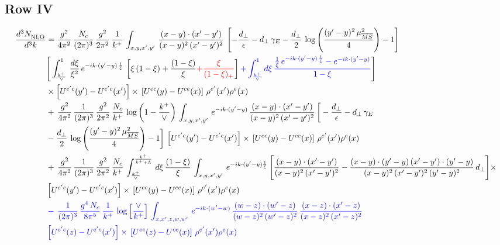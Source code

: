 \documentclass[9pt]{article}
\newcommand{\new}[1]{{\color{blue}#1}}
\newcommand{\nc}{\color{blue}}
\numberwithin{equation}{section}
\begin{document}
\subsection{Row IV}
\begin{align}
    \frac{d^{3}N_{\rm NLO}^{\rm}}{d^{3}k}  & = \frac{g^{2}}{4\pi^{2}}\, \frac{N_{c}}{(2\pi)^{3}}\,\frac{g^{2}}{2\pi^{2}}\, \frac{1}{k^{+}}\,\int_{x,y,x',y'}\,\frac{(x-y)\cdot (x'-y')}{(x-y)^{2}\,(x'-y')^{2}}\,\left[-\frac{d_{\perp}}{\epsilon}-d_{\perp}\,\gamma_{E}-\frac{d_{\perp}}{2}\,\log{\left(\frac{(y'-y)^{2}\,\mu^{2}_{\overline{MS}}}{4}\right)}-1\right]\,\notag \\ & \Bigg[\int_{\frac{k^{+}}{\vee}}^{1}\,\frac{d\xi}{\xi^{2}}\,e^{-ik\cdot (y'-y)\,\frac{1}{\xi}}\,\left[\xi\,(1-\xi)+\frac{(1-\xi)}{\xi}{\color{red}+\frac{\xi}{(1-\xi)_{+}}}\right]\new{+\int_{\frac{k^{+}}{\vee}}^{1}d\xi\,\frac{\frac{1}{\xi}\,e^{-ik\cdot (y'-y)\,\frac{1}{\xi}}-e^{-ik\cdot (y'-y)}}{1-\xi}}\Bigg]\notag \\ & \times \left[U^{e'c}(y') - U^{e'c}(x')\right] \times\, \left[U^{ec}(y) - U^{ce}(x)\right]\, \rho^{e'}(x') \rho^{e}(x)\notag \\ &  +\, \frac{g^{2}}{4\pi^{2}}\, \frac{1}{(2\pi)^{3}}\,\frac{g^{2}}{2\pi^{2}}\, \frac{N_{c}}{k^{+}}\, \log{\left(1-\frac{k^{+}}{\vee}\right)}\,\int_{x,y,x',y'}\,e^{-ik\cdot (y'-y)}\,\frac{(x-y)\cdot (x'-y')}{(x-y)^{2}\,(x'-y')^{2}}\,\bigg[-\frac{d_{\perp}}{\epsilon}-d_{\perp}\,\gamma_{E}\notag \\ & -\frac{d_{\perp}}{2}\,\log{\left(\frac{(y'-y)^{2}\,\mu^{2}_{\overline{MS}}}{4}\right)}-1\bigg]\,\left[U^{e'c}(y') - U^{e'c}(x')\right] \times\, \left[U^{ec}(y) - U^{ce}(x)\right]\, \rho^{e'}(x') \rho^{e}(x)\notag \\ & +\,\frac{g^{2}}{4\pi^{2}}\, \frac{1}{(2\pi)^{3}}\,\frac{g^{2}}{2\pi^{2}}\, \frac{N_{c}}{k^{+}}\,\int_{\frac{k^{+}}{\vee}}^{\frac{k^{+}}{k^{+}+\Lambda}}\,d\xi\, \frac{(1-\xi)}{\xi}\, \int_{x,y,x',y'}\,e^{-ik\cdot (y'-y)\frac{1}{\xi}}\,\Bigg[\frac{(x-y)\cdot (x'-y')}{(x-y)^{2}\, (x'-y')^{2}} -\frac{(x-y)\cdot (y'-y)\, (x'-y')\cdot (y'-y)}{(x-y)^{2}\,(x'-y')^{2}\,(y'-y)^{2}}\,d_{\perp}\Bigg]\times\notag \\ &  \left[U^{e'c}(y') - U^{e'c}(x')\right] \times\, \left[U^{ec}(y) - U^{ce}(x)\right]\, \rho^{e'}(x') \rho^{e}(x)
\notag \\ & \nc -\,\frac{1}{(2\pi)^{3}}\,\frac{g^{4}\,N_{c}}{8\pi^{5}}\,\frac{1}{k^{+}}\,\log{\left[\frac{\vee}{k^{+}}\right]}\,\int_{x,x',z,w,w'}\,e^{-ik\cdot (w'-w)}\,\frac{(w-z)\cdot(w'-z)}{(w-z)^{2}\,(w'-z)^{2}}\,\frac{(x-z)\cdot(x'-z)}{(x-z)^{2}\,(x'-z)^{2}}\notag \\ & \nc \left[U^{e'c}(z) - U^{e'c}(x')\right] \times\, \left[U^{ec}(z) - U^{ce}(x)\right]\, \rho^{e'}(x') \rho^{e}(x)
\end{align}
\end{document}
